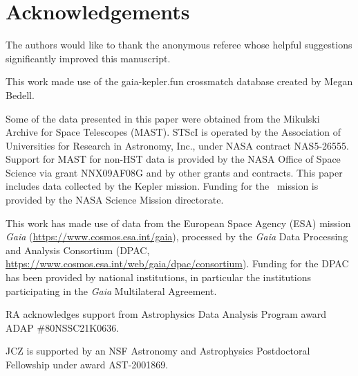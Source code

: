 \section*{Acknowledgements}

The authors would like to thank the anonymous referee whose helpful
suggestions significantly improved this manuscript.

This work made use of the gaia-kepler.fun crossmatch database created by Megan
Bedell.

Some of the data presented in this paper were obtained from the Mikulski
Archive for Space Telescopes (MAST).
STScI is operated by the Association of Universities for Research in
Astronomy, Inc., under NASA contract NAS5-26555.
Support for MAST for non-HST data is provided by the NASA Office of Space
Science via grant NNX09AF08G and by other grants and contracts.
This paper includes data collected by the Kepler mission. Funding for the
\Kepler\ mission is provided by the NASA Science Mission directorate.

This work has made use of data from the European Space Agency (ESA) mission
{\it Gaia} (\url{https://www.cosmos.esa.int/gaia}), processed by the {\it
Gaia} Data Processing and Analysis Consortium (DPAC,
\url{https://www.cosmos.esa.int/web/gaia/dpac/consortium}).
Funding for the DPAC has been provided by national institutions, in particular
the institutions participating in the {\it Gaia} Multilateral Agreement.

RA acknowledges support from Astrophysics Data Analysis Program award ADAP
\#80NSSC21K0636.

JCZ is supported by an NSF Astronomy and Astrophysics Postdoctoral Fellowship
under award AST-2001869.


